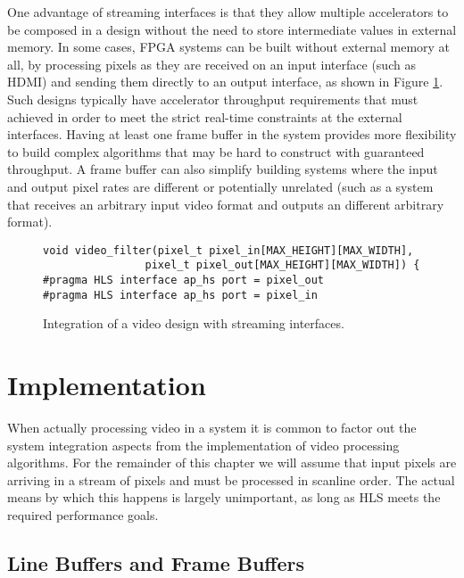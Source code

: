One advantage of streaming interfaces is that they allow multiple accelerators to be composed in a design without the need to store intermediate values in external memory.  In some cases, FPGA systems can be built without external memory at all, by processing pixels as they are received on an input interface (such as HDMI) and sending them directly to an output interface, as shown in Figure \ref{fig:video:streaming_interface}.  Such designs typically have accelerator throughput requirements that must achieved in order to meet the strict real-time constraints at the external interfaces.   Having at least one frame buffer in the system provides more flexibility to build complex algorithms that may be hard to construct with guaranteed throughput.  A frame buffer can also simplify building systems where the input and output pixel rates are different or potentially unrelated (such as a system that receives an arbitrary input video format and outputs an different arbitrary format).

\begin{figure}
\centering
\framebox{}
\begin{lstlisting}
void video_filter(pixel_t pixel_in[MAX_HEIGHT][MAX_WIDTH],
				pixel_t pixel_out[MAX_HEIGHT][MAX_WIDTH]) {
#pragma HLS interface ap_hs port = pixel_out
#pragma HLS interface ap_hs port = pixel_in
\end{lstlisting}
\caption{Integration of a video design with streaming interfaces.}\label{fig:video:streaming_interface}
\end{figure}

\section{Implementation}

When actually processing video in a system it is common to factor out the system integration aspects from the implementation of video processing algorithms.  For the remainder of this chapter we will assume that input pixels are arriving in a stream of pixels and must be processed in scanline order.  The actual means by which this happens is largely unimportant, as long as HLS meets the required performance goals. 

\subsection{Line Buffers and Frame Buffers}
\label{sec:video:buffering}

